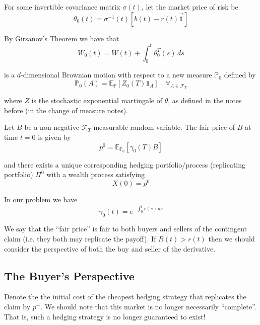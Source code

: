 \documentclass[12pt]{article}
\newenvironment{theorem}[2][Theorem:]{\begin{trivlist} %
\item[\hskip \labelsep {\bfseries #1}\hskip \labelsep {\bfseries #2.}]}{\end{trivlist}}
\newlength\tindent
\renewcommand{\indent}{\hspace*{\tindent}}
\renewcommand{\P}{\mathbb P}
\newcommand{\E}{\mathbb E}
\begin{document}
For some invertible covariance matrix $\sigma(t)$, let the market price of risk be
\begin{equation*}
	\theta_0(t) = \sigma^{-1}(t) \left[ b(t) - r(t) \mathds {\vec{1}} \right]
\end{equation*}

By Girsanov's Theorem we have that
\begin{equation*}
	W_0(t) = W(t) + \int^t_0 \theta^T_0(s)\,ds
\end{equation*}

is a $d$-dimensional Brownian motion with respect to a new measure $\P_0$ defined by
\begin{equation*}
	\P_0(A) = \E_\P \left[ Z_0(T) \mathds 1_A \right] \quad \forall_{A \in \mathcal F_T}
\end{equation*}

where $Z$ is the stochastic exponential martingale of $\theta$, as defined in the notes before (in the change of measure notes).

\begin{theorem}{} Let $B$ be a non-negative $\mathcal F_T$-measurable random variable. The fair price of $B$ at time $t = 0$ is given by
\begin{equation*}
	p^0 = \E_{\P_0} \left[ \gamma_0(T) B \right]
\end{equation*}

and there exists a unique corresponding hedging portfolio/process (replicating portfolio) $\Pi^0$ with a wealth process satisfying
\begin{equation*}
	X(0) = p^0
\end{equation*}
\end{theorem}

In our problem we have
\begin{equation*}
	\gamma_0(t) = e^{ -\int^t_0 r(s)\,ds }
\end{equation*}

\indent We say that the ``fair price'' is fair to both buyers and sellers of the contingent claim (i.e. they both may replicate the payoff). If $R(t) > r(t)$ then we should consider the perspective of both the buy and seller of the derivative.

\subsection{The Buyer's Perspective}

\indent Denote the the initial cost of the cheapest hedging strategy that replicates the claim by $p^+$. We should note that this market is no longer necessarily ``complete''. That is, such a hedging strategy is no longer guaranteed to exist! \\
\end{document}

